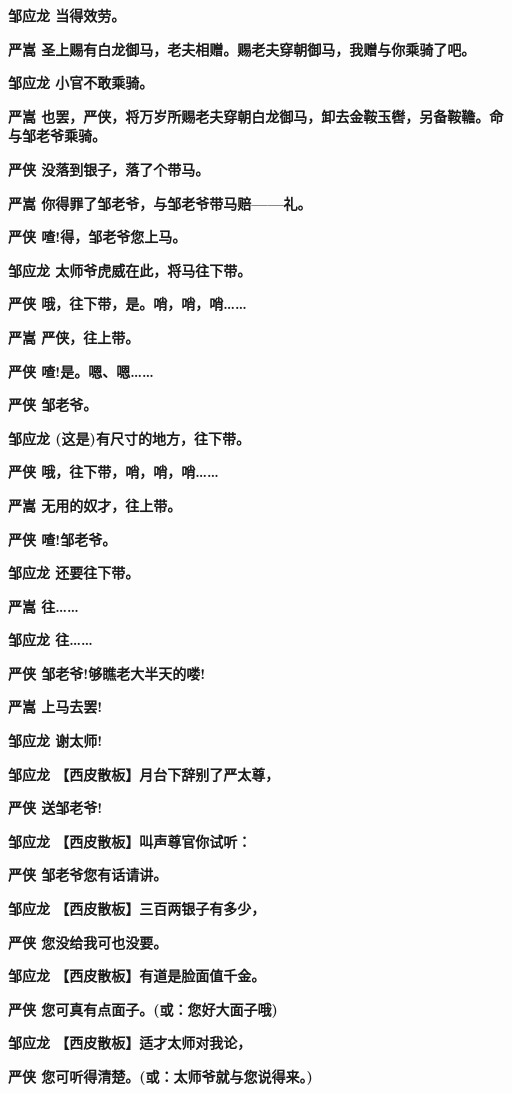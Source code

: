 \textbf{邹应龙 当得效劳。}

\textbf{严嵩
圣上赐有白龙御马，老夫相赠。赐老夫穿朝御马，我赠与你乘骑了吧。}

\textbf{邹应龙 小官不敢乘骑。}

\textbf{严嵩
也罢，严侠，将万岁所赐老夫穿朝白龙御马，卸去金鞍玉辔，另备鞍韂。命与邹老爷乘骑。}

\textbf{严侠 没落到银子，落了个带马。}

\textbf{严嵩 你得罪了邹老爷，与邹老爷带马赔------礼。}

\textbf{严侠 喳!得，邹老爷您上马。}

\textbf{邹应龙 太师爷虎威在此，将马往下带。}

\textbf{严侠 哦，往下带，是。哨，哨，哨\ldots{}\ldots{}}

\textbf{严嵩 严侠，往上带。}

\textbf{严侠 喳!是。嗯、嗯\ldots{}\ldots{}}

\textbf{严侠 邹老爷。}

\textbf{邹应龙 (这是)有尺寸的地方，往下带。}

\textbf{严侠 哦，往下带，哨，哨，哨\ldots{}\ldots{}}

\textbf{严嵩 无用的奴才，往上带。}

\textbf{严侠 喳!邹老爷。}

\textbf{邹应龙 还要往下带。}

\textbf{严嵩 往\ldots{}\ldots{}}

\textbf{邹应龙 往\ldots{}\ldots{}}

\textbf{严侠 邹老爷!够瞧老大半天的喽!}

\textbf{严嵩 上马去罢!}

\textbf{邹应龙 谢太师!}

\textbf{邹应龙 【西皮散板】月台下辞别了严太尊，}

\textbf{严侠 送邹老爷!}

\textbf{邹应龙 【西皮散板】叫声尊官你试听：}

\textbf{严侠 邹老爷您有话请讲。}

\textbf{邹应龙 【西皮散板】三百两银子有多少，}

\textbf{严侠 您没给我可也没要。}

\textbf{邹应龙 【西皮散板】有道是脸面值千金。}

\textbf{严侠 您可真有点面子。(或：您好大面子哦)}

\textbf{邹应龙 【西皮散板】适才太师对我论，}

\textbf{严侠 您可听得清楚。(或：太师爷就与您说得来。)}

